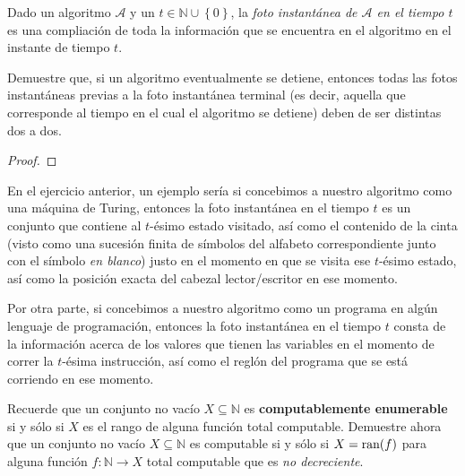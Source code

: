 \documentclass[12pt]{report}
\newcounter{it}
\theoremstyle{largebreak}
\newcommand\cf[3]{\ensuremath{#1:#2\rightarrow#3}}
\begin{document}
    \begin{sol}
        
    \end{sol}

    \begin{excer}
        Dado un algoritmo $\mathcal{A}$ y un $t\in\mathbb{N}\cup\left\{0\right\}$, la \textit{foto instantánea de $\mathcal{A}$ en el tiempo $t$} es una compliación de toda la información que se encuentra en el algoritmo en el instante de tiempo $t$.

        Demuestre que, si un algoritmo eventualmente se detiene, entonces todas las fotos instantáneas previas a la foto instantánea terminal (es decir, aquella que corresponde al tiempo en el cual el algoritmo se detiene) deben de ser distintas dos a dos.
    \end{excer}

    \begin{proof}
        
    \end{proof}

    \begin{exa}
        En el ejercicio anterior, un ejemplo sería si concebimos a nuestro algoritmo como una máquina de Turing, entonces la foto instantánea en el tiempo $t$ es un conjunto que contiene al $t$-ésimo estado visitado, así como el contenido de la cinta (visto como una sucesión finita de símbolos del alfabeto correspondiente junto con el símbolo \textit{en blanco}) justo en el momento en que se visita ese $t$-ésimo estado, así como la posición exacta del cabezal lector/escritor en ese momento.

        Por otra parte, si concebimos a nuestro algoritmo como un programa en algún lenguaje de programación, entonces la foto instantánea en el tiempo $t$ consta de la información acerca de los valores que tienen las variables en el momento de correr la $t$-ésima instrucción, así como el reglón del programa que se está corriendo en ese momento.
    \end{exa}

    \begin{excer}
        Recuerde que un conjunto no vacío $X\subseteq\mathbb{N}$ es \textbf{computablemente enumerable} si y sólo si $X$ es el rango de alguna función total computable. Demuestre ahora que un conjunto no vacío $X\subseteq\mathbb{N}$ es computable si y sólo si $X=\textup{ran}(f)$ para alguna función $\cf{f}{\mathbb{N}}{X}$ total computable que es \textit{no decreciente}.
    \end{excer}
\end{document}
